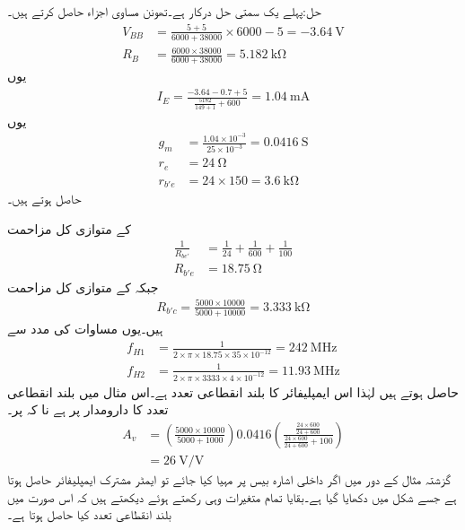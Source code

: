 حل:پہلے یک سمتی  حل درکار ہے۔تھونن مساوی اجزاء حاصل  کرتے ہیں۔
\begin{align*}
V_{BB}&=\frac{5+5}{6000+38000} \times 6000-5=\SI{-3.64}{\volt}\\
R_B&=\frac{6000 \times 38000}{6000 +38000}=\SI{5.182}{\kilo \ohm}
\end{align*}
یوں
\begin{align*}
I_E=\frac{-3.64-0.7+5}{\frac{5182}{149+1}+600}=\SI{1.04}{\milli \ampere}
\end{align*}
یوں
\begin{align*}
g_m&=\frac{1.04 \times 10^{-3}}{25 \times 10^{-3}}=\SI{0.0416}{\siemens}\\
r_e&=\SI{24}{\ohm}\\
r_{b'e}&=24 \times 150=\SI{3.6}{\kilo \ohm}
\end{align*}
حاصل ہوتے ہیں۔

 کے متوازی کل مزاحمت 
\begin{align*}
\frac{1}{R_{be'}}&=\frac{1}{24}+\frac{1}{600}+\frac{1}{100}\\
R_{b'e}&=\SI{18.75}{\ohm}
\end{align*}
جبکہ  کے متوازی کل مزاحمت
\begin{align*}
R_{b'c}=\frac{5000 \times 10000}{5000+10000}=\SI{3.333}{\kilo \ohm}
\end{align*}
ہیں۔یوں مساوات  کی مدد سے
\begin{align*}
f_{H1}&=\frac{1}{2 \times \pi \times 18.75 \times 35 \times 10^{-12}}=\SI{242}{\mega \hertz}\\
f_{H2}&=\frac{1}{2 \times \pi \times 3333 \times 4 \times 10^{-12}}=\SI{11.93}{\mega \hertz}
\end{align*}
حاصل ہوتے ہیں لہٰذا اس ایمپلیفائر کا بلند انقطاعی تعدد  ہے۔اس مثال میں بلند انقطاعی تعدد کا دارومدار   پر ہے نا کہ  پر۔
\begin{align*}
A_v&=\left(\frac{5000 \times 10000}{5000+1000}\right) 0.0416 \left(\frac{\frac{24 \times 600}{24+600}}{\frac{24 \times 600}{24+600} +100} \right)\\
&=\SI{26}{\volt \per \volt}
\end{align*}
گزشتہ مثال کے دور میں اگر داخلی اشارہ بیس  پر مہیا کیا جائے تو ایمٹر        مشترک ایمپلیفائر حاصل ہوتا ہے جسے شکل  میں دکھایا گیا ہے۔بقایا تمام متغیرات وہی رکھتے ہوئے دیکھتے ہیں کہ اس صورت میں بلند انقطاعی تعدد کیا حاصل ہوتا ہے۔

